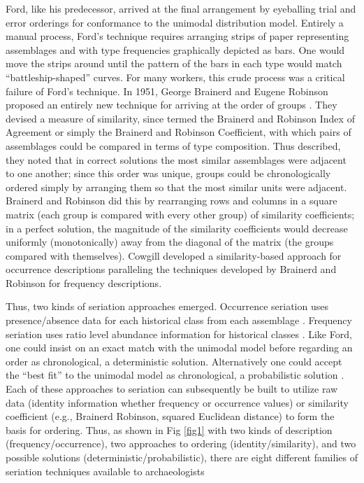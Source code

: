 \documentclass[10pt,letterpaper]{article}
\begin{document}
Ford, like his predecessor, arrived at the final arrangement by eyeballing trial and error orderings for conformance to the unimodal distribution model. Entirely a manual process, Ford’s technique requires arranging strips of paper representing assemblages and with type frequencies graphically depicted as bars. One would move the strips around until the pattern of the bars in each type would match “battleship-shaped” curves. For many workers, this crude process was a critical failure of Ford’s technique. In 1951, George Brainerd and Eugene Robinson proposed an entirely new technique for arriving at the order of groups \cite{Brainerd1951,Robinson1951}. They devised a measure of similarity, since termed the Brainerd and Robinson Index of Agreement or simply the Brainerd and Robinson Coefficient, with which pairs of assemblages could be compared in terms of type composition. Thus described, they noted that in correct solutions the most similar assemblages were adjacent to one another; since this order was unique, groups could be chronologically ordered simply by arranging them so that the most similar units were adjacent. Brainerd and Robinson did this by rearranging rows and columns in a square matrix (each group is compared with every other group) of similarity coefficients; in a perfect solution, the magnitude of the similarity coefficients would decrease uniformly (monotonically) away from the diagonal of the matrix (the groups compared with themselves). Cowgill \cite{Cowgill1972} developed a similarity-based approach for occurrence descriptions paralleling the techniques developed by Brainerd and Robinson for frequency descriptions.

Thus, two kinds of seriation approaches emerged. Occurrence seriation uses presence/absence data for each historical class from each assemblage  \cite{Petrie:1899aa,Kroeber1916}. Frequency seriation uses ratio level abundance information for historical classes \cite{Spier1917,Ford:1938aa,Ford:1962aa}. Like Ford, one could insist on an exact match with the unimodal model before regarding an order as chronological, a deterministic solution. Alternatively one could accept the “best fit” to the unimodal model as chronological, a probabilistic solution \cite{Dunnell:1981aa}. Each of these approaches to seriation can subsequently be built to utilize raw data (identity information whether frequency or occurrence values) or similarity coefficient (e.g., Brainerd Robinson, squared Euclidean distance) to form the basis for ordering. Thus, as shown in Fig \ref{fig1} with two kinds of description (frequency/occurrence), two approaches to ordering (identity/similarity), and two possible solutions (deterministic/probabilistic), there are eight different families of seriation techniques  available to archaeologists \cite{Dunnell:1970aa,Dunnell:1981aa} 
\end{document}
